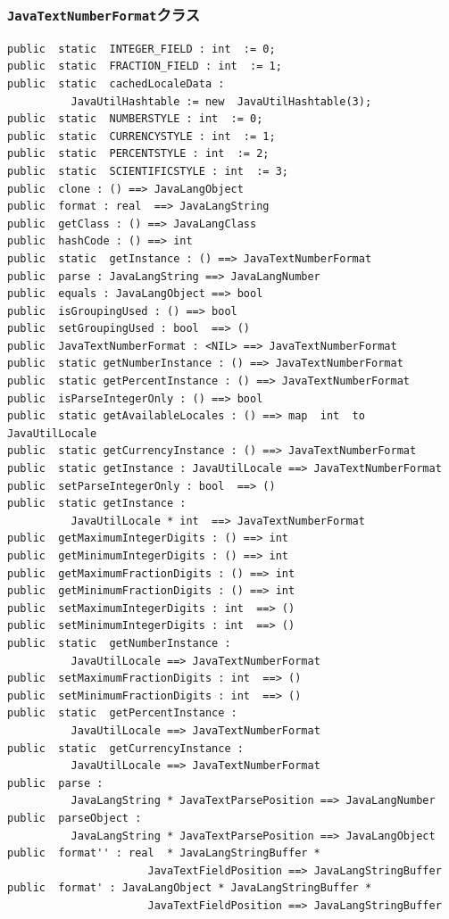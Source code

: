 \documentclass[\pformat,12pt]{jarticle}
\begin{document}
\subsubsection{\texttt{JavaTextNumberFormat}クラス}
\begin{small}
\begin{verbatim}
public  static  INTEGER_FIELD : int  := 0;
public  static  FRACTION_FIELD : int  := 1;
public  static  cachedLocaleData : 
          JavaUtilHashtable := new  JavaUtilHashtable(3);
public  static  NUMBERSTYLE : int  := 0;
public  static  CURRENCYSTYLE : int  := 1;
public  static  PERCENTSTYLE : int  := 2;
public  static  SCIENTIFICSTYLE : int  := 3;
public  clone : () ==> JavaLangObject
public  format : real  ==> JavaLangString
public  getClass : () ==> JavaLangClass
public  hashCode : () ==> int
public  static  getInstance : () ==> JavaTextNumberFormat
public  parse : JavaLangString ==> JavaLangNumber
public  equals : JavaLangObject ==> bool
public  isGroupingUsed : () ==> bool
public  setGroupingUsed : bool  ==> ()
public  JavaTextNumberFormat : <NIL> ==> JavaTextNumberFormat
public  static getNumberInstance : () ==> JavaTextNumberFormat
public  static getPercentInstance : () ==> JavaTextNumberFormat
public  isParseIntegerOnly : () ==> bool
public  static getAvailableLocales : () ==> map  int  to  JavaUtilLocale
public  static getCurrencyInstance : () ==> JavaTextNumberFormat
public  static getInstance : JavaUtilLocale ==> JavaTextNumberFormat
public  setParseIntegerOnly : bool  ==> ()
public  static getInstance : 
          JavaUtilLocale * int  ==> JavaTextNumberFormat
public  getMaximumIntegerDigits : () ==> int
public  getMinimumIntegerDigits : () ==> int
public  getMaximumFractionDigits : () ==> int
public  getMinimumFractionDigits : () ==> int
public  setMaximumIntegerDigits : int  ==> ()
public  setMinimumIntegerDigits : int  ==> ()
public  static  getNumberInstance : 
          JavaUtilLocale ==> JavaTextNumberFormat
public  setMaximumFractionDigits : int  ==> ()
public  setMinimumFractionDigits : int  ==> ()
public  static  getPercentInstance : 
          JavaUtilLocale ==> JavaTextNumberFormat
public  static  getCurrencyInstance : 
          JavaUtilLocale ==> JavaTextNumberFormat
public  parse : 
          JavaLangString * JavaTextParsePosition ==> JavaLangNumber
public  parseObject : 
          JavaLangString * JavaTextParsePosition ==> JavaLangObject
public  format'' : real  * JavaLangStringBuffer * 
                      JavaTextFieldPosition ==> JavaLangStringBuffer
public  format' : JavaLangObject * JavaLangStringBuffer * 
                      JavaTextFieldPosition ==> JavaLangStringBuffer
\end{verbatim}
\end{small}
\end{document}
